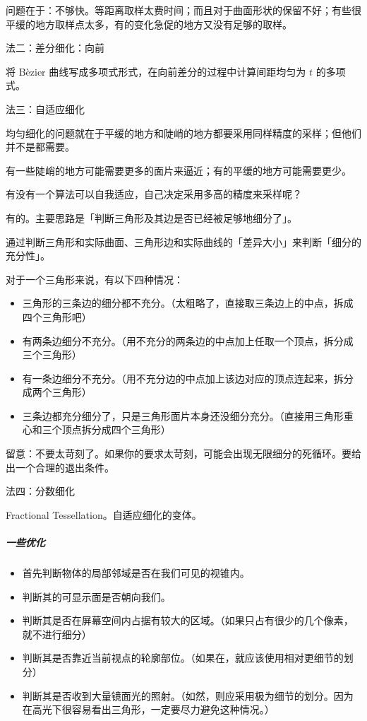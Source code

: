 \documentclass[
]{article}
\begin{document}
问题在于：不够快。等距离取样太费时间；而且对于曲面形状的保留不好；有些很平缓的地方取样点太多，有的变化急促的地方又没有足够的取样。

法二：差分细化：向前

将 Bèzier 曲线写成多项式形式，在向前差分的过程中计算间距均匀为 \(t\)
的多项式。

法三：自适应细化

均匀细化的问题就在于平缓的地方和陡峭的地方都要采用同样精度的采样；但他们并不是都需要。

有一些陡峭的地方可能需要更多的面片来逼近；有的平缓的地方可能需要更少。

有没有一个算法可以自我适应，自己决定采用多高的精度来采样呢？

有的。主要思路是「判断三角形及其边是否已经被足够地细分了」。

通过判断三角形和实际曲面、三角形边和实际曲线的「差异大小」来判断「细分的充分性」。

对于一个三角形来说，有以下四种情况：

\begin{itemize}
\item
  三角形的三条边的细分都不充分。（太粗略了，直接取三条边上的中点，拆成四个三角形吧）
\item
  有两条边细分不充分。（用不充分的两条边的中点加上任取一个顶点，拆分成三个三角形）
\item
  有一条边细分不充分。（用不充分边的中点加上该边对应的顶点连起来，拆分成两个三角形）
\item
  三条边都充分细分了，只是三角形面片本身还没细分充分。（直接用三角形重心和三个顶点拆分成四个三角形）
\end{itemize}

留意：不要太苛刻了。如果你的要求太苛刻，可能会出现无限细分的死循环。要给出一个合理的退出条件。

法四：分数细化

Fractional Tessellation。自适应细化的变体。

\hypertarget{header-n118}{%
\subparagraph{一些优化}\label{header-n118}}

\begin{itemize}
\item
  首先判断物体的局部邻域是否在我们可见的视锥内。
\item
  判断其的可显示面是否朝向我们。
\item
  判断其是否在屏幕空间内占据有较大的区域。（如果只占有很少的几个像素，就不进行细分）
\item
  判断其是否靠近当前视点的轮廓部位。（如果在，就应该使用相对更细节的划分）
\item
  判断其是否收到大量镜面光的照射。（如然，则应采用极为细节的划分。因为在高光下很容易看出三角形，一定要尽力避免这种情况。）
\end{itemize}
\end{document}
